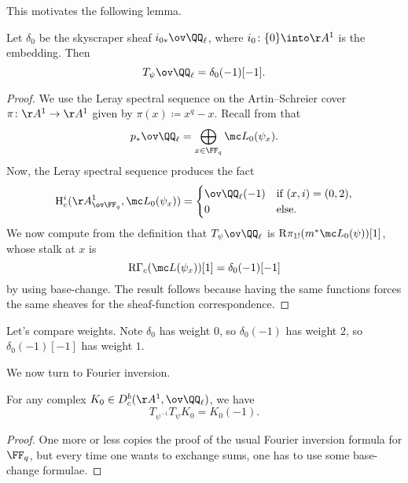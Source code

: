 \documentclass[../notes.tex]{subfiles}
\begin{document}
This motivates the following lemma.
\begin{lemma}
	Let $\delta_0$ be the skyscraper sheaf $i_{0*}\ov\QQ_\ell$, where $i_0\colon\{0\}\into\AA^1$ is the embedding. Then
	\[T_\psi\ov\QQ_\ell=\delta_0(-1)[-1].\]
\end{lemma}
\begin{proof}
	We use the Leray spectral sequence on the Artin--Schreier cover $\pi\colon\AA^1\to\AA^1$ given by $\pi(x)\coloneqq x^q-x$. Recall from  that
	\[p_*\ov\QQ_\ell=\bigoplus_{x\in\FF_q}\mc L_0(\psi_x).\]
	Now, the Leray spectral sequence produces the fact
	\[\mathrm H^i_c(\AA^1_{\ov\FF_q},\mc L_0(\psi_x))=\begin{cases}
		\ov\QQ_\ell(-1) & \text{if }(x,i)=(0,2), \\
		0 & \text{else}.
	\end{cases}\]
	We now compute from the definition that $T_\psi\ov\QQ_\ell$ is $\mathrm R\pi_{1!}(m^*\mc L_0(\psi))[1]$, whose stalk at $x$ is
	\[\mathrm R\Gamma_c(\mc L(\psi_x))[1]=\delta_0(-1)[-1]\]
	by using base-change. The result follows because having the same functions forces the same sheaves for the sheaf-function correspondence.
\end{proof}
\begin{remark}
	Let's compare weights. Note $\delta_0$ has weight $0$, so $\delta_0(-1)$ has weight $2$, so $\delta_0(-1)[-1]$ has weight $1$.
\end{remark}
We now turn to Fourier inversion.
\begin{theorem}
	For any complex $K_0\in D^b_c(\AA^1,\ov\QQ_\ell)$, we have
	\[T_{\psi^{-1}}T_\psi K_0=K_0(-1).\]
\end{theorem}
\begin{proof}
	One more or less copies the proof of the usual Fourier inversion formula for $\FF_q$, but every time one wants to exchange sums, one has to use some base-change formulae.
\end{proof}
\end{document}
